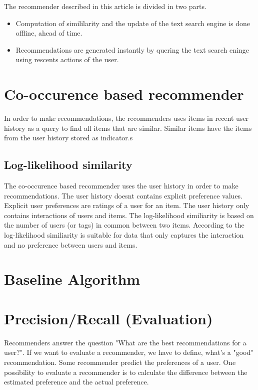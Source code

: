 \documentclass[twoside,a4paper]{article}
\begin{document}
The recommender described in this article is divided in two parts.
\begin{itemize}
\item Computation of simililarity and the update of the text search engine is done offline, ahead of time.
\item Recommendations are generated instantly by quering the text search eninge using rescents actions of the user.
\end{itemize}

\section{Co-occurence based recommender}
\label{sec:cooccurence}

In order to make recommendations, the recommenders uses items in recent user history as a query to find all items that are similar. Similar items have the items from the user history stored as indicator.s

\subsection{Log-likelihood similarity}
\label{sec:llr}

The co-occurence based recommender uses the user history in order to make recommendations. The user history doesnt contains explicit preference values. Explicit user preferences are ratings of a user for an item. The user history only contains interactions of users and items. The log-likelihood similiarity is based on the number of users (or tags) in common between two items. According to \cite{Dunning93} the log-likelihood similiarity is suitable for data that only captures the interaction and no preference between users and items. 

\section{Baseline Algorithm}
\label{sec:baselinealgorithm}

\section{Precision/Recall (Evaluation)}
\label{sec:evaluation}
Recommenders answer the question "What are the best recommendations for a user?". If we want to evaluate a recommender, we have to define, what's a "good" recommendation.
Some recommender predict the preferences of a user. One possibility to evaluate a recommender is to calculate the difference between the estimated preference and the actual preference.
\end{document}
